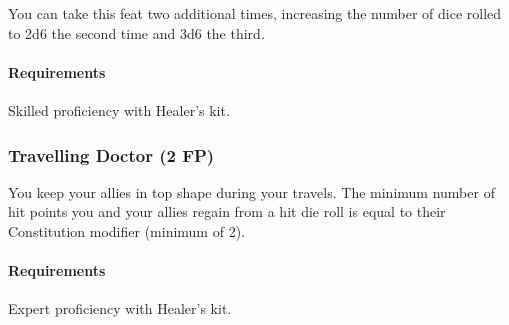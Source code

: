     You can take this feat two additional times, increasing the number of dice rolled to 2d6 the second time and 3d6 the third.
    \paragraph{Requirements} Skilled proficiency with Healer's kit.
\subsubsection{Travelling Doctor (2 FP)} \label{feat::travellingdoctor}
    You keep your allies in top shape during your travels.
    The minimum number of hit points you and your allies regain from a hit die roll is equal to their Constitution modifier (minimum of 2).
    \paragraph{Requirements} Expert proficiency with Healer's kit.

